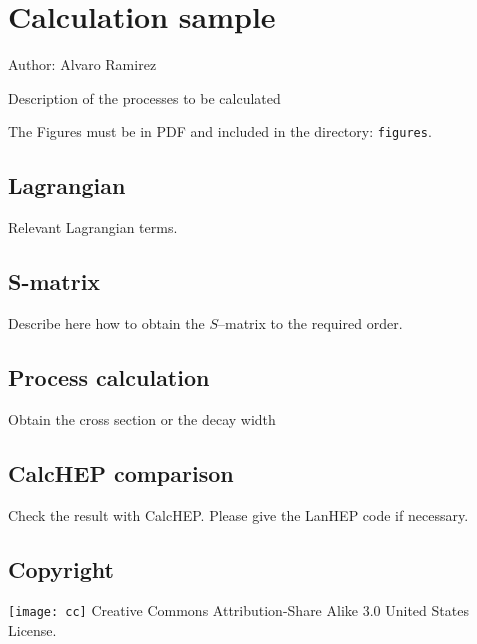 \chapter{Calculation sample}

Author: Alvaro Ramirez

Description of the processes to be calculated

The Figures must be in PDF and included in the directory: \verb|figures|.

\section{Lagrangian}
Relevant Lagrangian terms.

\section{S-matrix}
Describe here how to obtain the $S$--matrix to the required order.

\section{Process calculation}
Obtain the cross section or the decay width

\section{CalcHEP comparison}
Check the result with CalcHEP. Please give the LanHEP code if necessary.


\section{Copyright}
\texttt{[image: cc]} Creative Commons Attribution-Share Alike 3.0 United States License.




